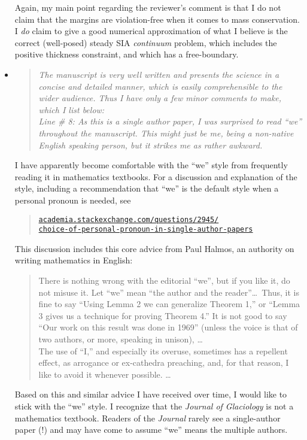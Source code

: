 \documentclass[11pt,reqno]{amsart}
\newcommand{\reply}[2]{
\medskip\medskip
\item  \begin{quote}
\emph{#1}
\end{quote}

\medskip
\noindent #2}
\begin{document}
\begin{itemize}
{Again, my main point regarding the reviewer's comment is that I do not claim that the margins are violation-free when it comes to mass conservation.  I \emph{do} claim to give a good numerical approximation of what I believe is the correct (well-posed) steady SIA \emph{continuum} problem, which includes the positive thickness constraint, and which has a free-boundary.}

\reply{The manuscript is very well written and presents the science in a concise and detailed manner, which is easily comprehensible to the wider audience.  Thus I have only a few minor comments to make, which I list below:
\medskip \\
Line \# 8: As this is a single author paper, I was surprised to read ``we'' throughout the manuscript. This might just be me, being a non-native English speaking person, but it strikes me as rather awkward.}
{I have apparently become comfortable with the ``we'' style from frequently reading it in mathematics textbooks.  For a discussion and explanation of the style, including a recommendation that ``we'' is the default style when a personal pronoun is needed, see\begin{quote}
\href{http://academia.stackexchange.com/questions/2945/choice-of-personal-pronoun-in-single-author-papers}{\texttt{academia.stackexchange.com/questions/2945/\\ \phantom{foobar} choice-of-personal-pronoun-in-single-author-papers}}
\end{quote}
This discussion includes this core advice from Paul Halmos, an authority on writing mathematics in English: \begin{quote} \medskip
There is nothing wrong with the editorial ``we'', but if you like it, do not misuse it.  Let ``we'' mean ``the author and the reader''\dots  \, Thus, it is fine to say ``Using Lemma 2 we can generalize Theorem 1,'' or ``Lemma 3 gives us a technique for proving Theorem 4.''  It is not good to say ``Our work on this result was done in 1969'' (unless the voice is that of two authors, or more, speaking in unison), \dots \medskip \\
\indent The use of ``I,'' and especially its overuse, sometimes has a repellent effect, as arrogance or ex-cathedra preaching, and, for that reason, I like to avoid it whenever possible. \dots \medskip
\end{quote}
Based on this and similar advice I have received over time, I would like to stick with the ``we'' style.  I recognize that the \emph{Journal of Glaciology} is not a mathematics textbook.  Readers of the \emph{Journal} rarely see a single-author paper (!) and may have come to assume ``we'' means the multiple authors.

}
\end{itemize}
\end{document}

